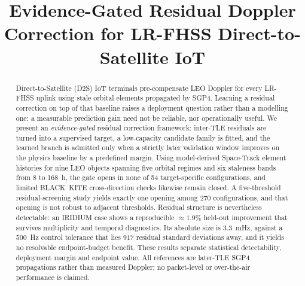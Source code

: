 \documentclass[conference]{IEEEtran}
\begin{document}
\title{Evidence-Gated Residual Doppler Correction for LR-FHSS
Direct-to-Satellite IoT}

\author{
}

\maketitle

\begin{abstract}
Direct-to-Satellite (D2S) IoT terminals pre-compensate LEO Doppler for every
LR-FHSS uplink using stale orbital elements propagated by SGP4. Learning a
residual correction on top of that baseline raises a deployment question rather
than a modelling one: a measurable prediction gain need not be reliable, nor
operationally useful. We present an \emph{evidence-gated} residual correction
framework: inter-TLE residuals are turned into a supervised target, a
low-capacity candidate family is fitted, and the learned branch is admitted only
when a strictly later validation window improves on the physics baseline by a
predefined margin. Using model-derived Space-Track element histories for nine
LEO objects spanning five orbital regimes and six staleness bands from 8 to
168~h, the gate opens in none of 54 target-specific configurations, and limited
BLACK~KITE cross-direction checks likewise remain closed. A five-threshold
residual-screening study yields exactly one opening among 270 configurations,
and that opening is not robust to adjacent thresholds. Residual structure is
nevertheless detectable: an IRIDIUM case shows a reproducible $\approx1.9\%$
held-out improvement that survives multiplicity and temporal diagnostics. Its
absolute size is $3.3$~mHz, against a $500$~Hz control tolerance that lies $917$
residual standard deviations away, and it yields no resolvable endpoint-budget
benefit. These results separate statistical detectability, deployment margin and
endpoint value. All references are later-TLE SGP4 propagations rather than
measured Doppler; no packet-level or over-the-air performance is claimed.
\end{abstract}
\end{document}
